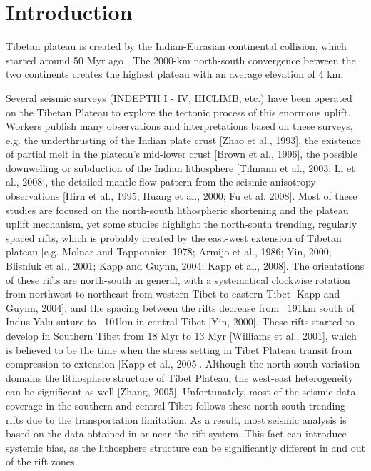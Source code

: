 \section{Introduction}

Tibetan plateau is created by the Indian-Eurasian continental collision, which started around 50 Myr ago \cite{Patriat_1984}. The 2000-km north-south convergence between the two continents creates the highest plateau with an average elevation of 4 km. 



Several seismic surveys (INDEPTH I - IV, HICLIMB, etc.) have been operated on the Tibetan Plateau to explore the tectonic process of this enormous uplift. Workers publish many observations and interpretations based on these surveys, e.g. the underthrusting of the Indian plate crust [Zhao et al., 1993], the existence of partial melt in the plateau’s mid-lower crust [Brown et al., 1996], the possible downwelling or subduction of the Indian lithosphere [Tilmann et al., 2003; Li et al., 2008], the detailed mantle flow pattern from the seismic anisotropy observations [Hirn et al., 1995; Huang et al., 2000; Fu et al. 2008].
Most of these studies are focused on the north-south lithospheric shortening and the plateau uplift mechanism, yet some studies highlight the north-south trending, regularly spaced rifts, which is probably created by the east-west extension of Tibetan plateau [e.g. Molnar and Tapponnier, 1978; Armijo et al., 1986; Yin, 2000; Blisniuk et al., 2001; Kapp and Guynn, 2004; Kapp et al., 2008]. The orientations of these rifts are north-south in general, with a systematical clockwise rotation from northwest to northeast from western Tibet to eastern Tibet [Kapp and Guynn, 2004], and the spacing between the rifts decrease from ~191km south of Indus-Yalu suture to ~101km in central Tibet [Yin, 2000]. These rifts started to develop in Southern Tibet from 18 Myr to 13 Myr [Williams et al., 2001], which is believed to be the time when the stress setting in Tibet Plateau transit from compression to extension [Kapp et al., 2005]. 
Although the north-south variation domains the lithosphere structure of Tibet Plateau, the west-east heterogeneity can be significant as well [Zhang, 2005]. Unfortunately, most of the seismic data coverage in the southern and central Tibet follows these north-south trending rifts due to the transportation limitation. As a result, most seismic analysis is based on the data obtained in or near the rift system. This fact can introduce systemic bias, as the lithosphere structure can be significantly different in and out of the rift zones.
